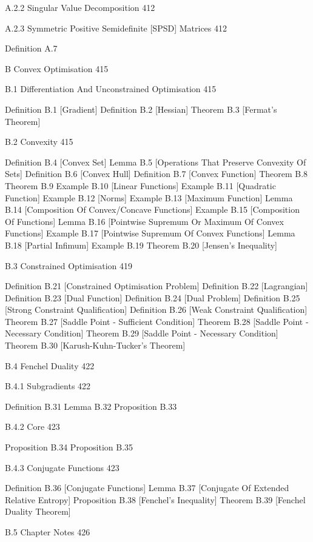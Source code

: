 A.2.2 Singular Value Decomposition 412



A.2.3 Symmetric Positive Semidefinite [SPSD] Matrices 412

Definition A.7

B Convex Optimisation 415



B.1 Differentiation And Unconstrained Optimisation 415

Definition B.1 [Gradient]
Definition B.2 [Hessian]
Theorem B.3 [Fermat's Theorem]

B.2 Convexity 415

Definition B.4 [Convex Set]
Lemma B.5 [Operations That Preserve Convexity Of Sets]
Definition B.6 [Convex Hull]
Definition B.7 [Convex Function]
Theorem B.8
Theorem B.9
Example B.10 [Linear Functions]
Example B.11 [Quadratic Function] 
Example B.12 [Norms]
Example B.13 [Maximum Function]
Lemma B.14 [Composition Of Convex/Concave Functions]
Example B.15 [Composition Of Functions]
Lemma B.16 [Pointwise Supremum Or Maximum Of Convex Functions]
Example B.17 [Pointwise Supremum Of Convex Functions]
Lemma B.18 [Partial Infimum]
Example B.19
Theorem B.20 [Jensen's Inequality] 

B.3 Constrained Optimisation 419

Definition B.21 [Constrained Optimisation Problem]
Definition B.22 [Lagrangian]
Definition B.23 [Dual Function]
Definition B.24 [Dual Problem]
Definition B.25 [Strong Constraint Qualification]
Definition B.26 [Weak Constraint Qualification]
Theorem B.27 [Saddle Point - Sufficient Condition]
Theorem B.28 [Saddle Point - Necessary Condition]
Theorem B.29 [Saddle Point - Necessary Condition]
Theorem B.30 [Karush-Kuhn-Tucker's Theorem]

B.4 Fenchel Duality 422



B.4.1 Subgradients 422

Definition B.31
Lemma B.32
Proposition B.33

B.4.2 Core 423

Proposition B.34
Proposition B.35

B.4.3 Conjugate Functions 423

Definition B.36 [Conjugate Functions]
Lemma B.37 [Conjugate Of Extended Relative Entropy]
Proposition B.38 [Fenchel's Inequality]
Theorem B.39 [Fenchel Duality Theorem]

B.5 Chapter Notes 426



